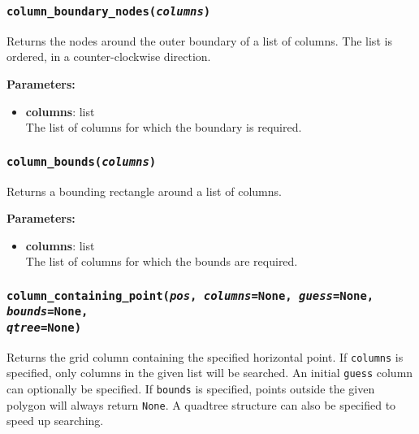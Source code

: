 \subsubsection{\texttt{column\_boundary\_nodes(\emph{columns})}}

Returns the nodes around the outer boundary of a list of columns.  The list is ordered, in a counter-clockwise direction.

\textbf{Parameters:}
\begin{itemize}
\item \textbf{columns}: list\\
  The list of columns for which the boundary is required.
\end{itemize}

\subsubsection{\texttt{column\_bounds(\emph{columns})}}

Returns a bounding rectangle around a list of columns.

\textbf{Parameters:}
\begin{itemize}
\item \textbf{columns}: list\\
  The list of columns for which the bounds are required.
\end{itemize}

\subsubsection{\texttt{column\_containing\_point(\emph{pos}, \emph{columns}=None, \emph{guess}=None, \emph{bounds}=None,\\
\emph{qtree}=None)}}

Returns the grid column containing the specified horizontal point.  If \texttt{columns} is specified, only columns in the given list will be searched.  An initial \texttt{guess} column can optionally be specified.  If \texttt{bounds} is specified, points outside the given polygon will always return \texttt{None}.  A quadtree structure can also be specified to speed up searching.

